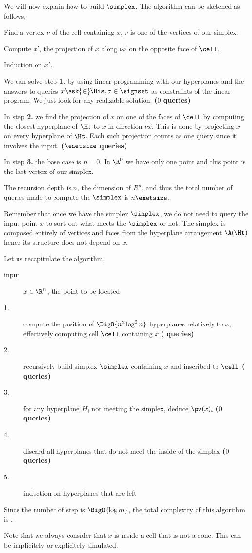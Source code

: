 We will now explain how to build $\simplex$. The algorithm can be sketched as
follows,

\begin{description}
\addtolength{\itemsep}{-0.5\baselineskip}
\item[1.$\;$] Find a vertex $\nu$ of the cell containing $x$, $\nu$ is one of
the vertices of our simplex.
\item[2.$\;$] Compute $x'$, the projection of $x$ along $\vec{\nu x}$ on the
opposite face of $\cell$.
\item[3.$\;$] Induction on $x'$.
\end{description}

We can solve step \textbf{1.} by using linear programming with our
\BigO{\enetsize} hyperplanes and the
answers to queries $x \ask{\in} \His, \sigma \in \signset$ as
constraints of the linear program. We just look for any realizable solution.
\textbf{($0$ queries)}

In step \textbf{2.} we find the projection of $x$ on one of the faces of
$\cell$ by computing the closest hyperplane of $\Ht$ to $x$ in direction
$\vec{\nu x}$.
This is done by projecting $x$ on every hyperplane of $\Ht$. Each such
projection counts as one query since it involves the input.
\textbf{($\enetsize$ queries)}

In step \textbf{3.} the base case is $n = 0$. In $\R^0$ we have only one point
and this point is the last vertex of our simplex.

The recursion depth is $n$, the dimension of $R^n$, and thus the total number
of queries made to compute the $\simplex$ is $n \enetsize$.

Remember that once we have the simplex $\simplex$, we do not need to query the input point
$x$ to sort out what meets the $\simplex$ or not. The simplex is composed
entirely of vertices and faces from the hyperplane arrangement $\A(\Ht)$ hence
its structure does not depend on $x$.

Let us recapitulate the algorithm,

\begin{description}
\item[input] $x \in \R^n$, the point to be located
\item[1.] compute the position of $\BigO{n^2 \log^2 n}$ hyperplanes relatively to
$x$, effectively computing cell $\cell$ containing $x$ \textbf{( queries)}
\item[2.] recursively build simplex $\simplex$ containing $x$ and inscribed to $\cell$
\textbf{( queries)}
\item[3.] for any hyperplane $H_i$ not meeting the simplex, deduce $\pv(x)_i$
\textbf{($0$ queries)}
\item[4.] discard all hyperplanes that do not meet the inside of the
simplex \textbf{($0$ queries)}
\item[5.] induction on hyperplanes that are left
\end{description}

Since the number of step is $\BigO{\log m}$, the total complexity of this algorithm
is .

Note that we always consider that $x$ is inside a cell that is not a cone.
This can be implicitely or explicitely simulated.









